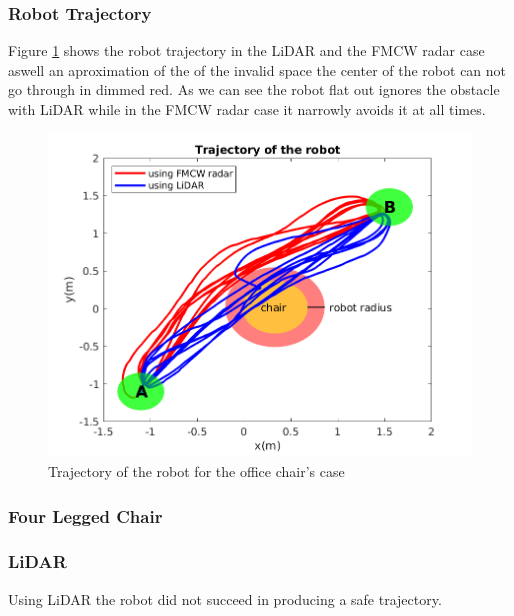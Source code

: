 \subsubsection*{Robot Trajectory}
Figure \ref{fig:traj1} shows the robot trajectory in the \ac{LiDAR} and the \ac{FMCW} radar case aswell an aproximation of the of the invalid space the  center of the robot can not go through in dimmed red. As we can see the robot flat out ignores the obstacle with \ac{LiDAR} while in the \ac{FMCW} \ac{radar} case it narrowly avoids it at all times.
\begin{figure}[ht!]
\centerline{\includegraphics [width=0.7 \textwidth]{imgs/chapter5/traj1.png}}
\caption{Trajectory of the robot for the office chair's case}
\label{fig:traj1}
\end{figure}


\subsubsection{Four Legged Chair}
\subsubsection*{LiDAR}
Using \ac{LiDAR} the robot did not succeed in producing a safe trajectory.

